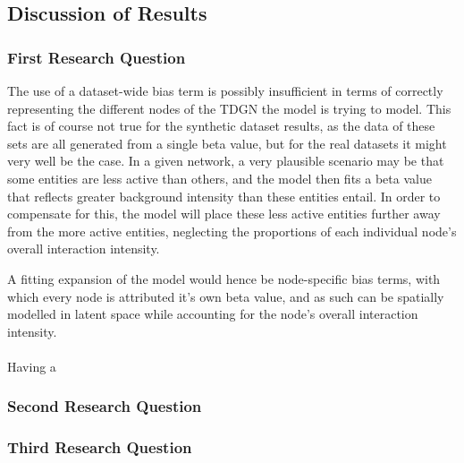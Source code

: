 

\subsection{Discussion of Results}
\label{sec:Discussion:Results}

\subsubsection{First Research Question}
\label{sec:Discussion:Results_Q1}

The use of a dataset-wide bias term is possibly insufficient in terms of correctly representing the different nodes of the TDGN the model is trying to model. 
This fact is of course not true for the synthetic dataset results, as the data of these sets are all generated from a single beta value, but for the real datasets it might very well be the case.
In a given network, a very plausible scenario may be that some entities are less active than others, and the model then fits a beta value that reflects greater background intensity than these entities entail.
In order to compensate for this, the model will place these less active entities further away from the more active entities, neglecting the proportions of each individual node's overall interaction intensity.

A fitting expansion of the model would hence be node-specific bias terms, with which every node is attributed it's own beta value, and as such can be spatially modelled in latent space while accounting for the node's overall interaction intensity. 
\\\\





Having a 

\subsubsection{Second Research Question}
\label{sec:Discussion:Results_Q2}




\subsubsection{Third Research Question}
\label{sec:Discussion:Results_Q3}
